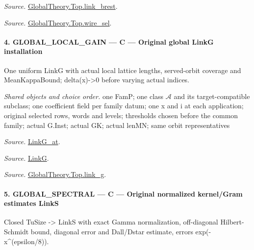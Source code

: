 \emph{Source.} \href{https://github.com/CocoSgt/riemann-hypothesis-lean/blob/7cbf7a0c32fca1badf05931879a37c3f8a2b03b4/src/Development/AbelianVarietyTheory/Proofs/GlobalInterpolation/LinkBrest.lean#L7-L25}{GlobalTheory.Top.link\_\allowbreak brest}.

\emph{Source.} \href{https://github.com/CocoSgt/riemann-hypothesis-lean/blob/7cbf7a0c32fca1badf05931879a37c3f8a2b03b4/src/Development/AbelianVarietyTheory/Proofs/GlobalInterpolation/WireSel.lean#L11-L41}{GlobalTheory.Top.wire\_\allowbreak sel}.



\paragraph{4. GLOBAL\_\allowbreak LOCAL\_\allowbreak GAIN — C — Original global LinkG installation}

One uniform LinkG with actual local lattice lengths, served-orbit coverage and MeanKappaBound; delta(x)->0 before varying actual indices.

\emph{Shared objects and choice order.} one FamP; one class $\mathcal A$ and its target-compatible subclass; one coefficient field per family datum; one x and i at each application; original selected rows, words and levels; thresholds chosen before the common family; actual G.Inst; actual GK; actual lenMN; same orbit representatives

\emph{Source.} \href{https://github.com/CocoSgt/riemann-hypothesis-lean/blob/7cbf7a0c32fca1badf05931879a37c3f8a2b03b4/src/Formalism/SharpRestriction/GlobalTheoremInputs.lean#L122-L137}{LinkG\_\allowbreak at}.

\emph{Source.} \href{https://github.com/CocoSgt/riemann-hypothesis-lean/blob/7cbf7a0c32fca1badf05931879a37c3f8a2b03b4/src/Formalism/SharpRestriction/GlobalTheoremInputs.lean#L138-L141}{LinkG}.

\emph{Source.} \href{https://github.com/CocoSgt/riemann-hypothesis-lean/blob/7cbf7a0c32fca1badf05931879a37c3f8a2b03b4/src/Development/AbelianVarietyTheory/Proofs/GlobalInterpolation/LinkG.lean#L14-L27}{GlobalTheory.Top.link\_\allowbreak g}.



\paragraph{5. GLOBAL\_\allowbreak SPECTRAL — C — Original normalized kernel/Gram estimates LinkS}

Closed TuSize -> LinkS with exact Gamma normalization, off-diagonal Hilbert-Schmidt bound, diagonal error and Dall/Dstar estimate, errors exp(-x\textasciicircum{}(epsilon/8)).

